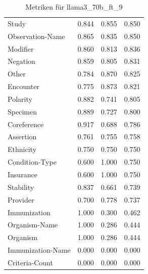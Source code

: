 \begin{table}[htbp]
\begin{tabular}{p{5cm}ccc}
Study & 0.844 & 0.855 & 0.850 \\
Observation-Name & 0.865 & 0.835 & 0.850 \\
Modifier & 0.860 & 0.813 & 0.836 \\
Negation & 0.859 & 0.805 & 0.831 \\
Other & 0.784 & 0.870 & 0.825 \\
Encounter & 0.775 & 0.873 & 0.821 \\
Polarity & 0.882 & 0.741 & 0.805 \\
Specimen & 0.889 & 0.727 & 0.800 \\
Coreference & 0.917 & 0.688 & 0.786 \\
Assertion & 0.761 & 0.755 & 0.758 \\
Ethnicity & 0.750 & 0.750 & 0.750 \\
Condition-Type & 0.600 & 1.000 & 0.750 \\
Insurance & 0.600 & 1.000 & 0.750 \\
Stability & 0.837 & 0.661 & 0.739 \\
Provider & 0.700 & 0.778 & 0.737 \\
Immunization & 1.000 & 0.300 & 0.462 \\
Organism-Name & 1.000 & 0.286 & 0.444 \\
Organism & 1.000 & 0.286 & 0.444 \\
Immunization-Name & 0.000 & 0.000 & 0.000 \\
Criteria-Count & 0.000 & 0.000 & 0.000 \\
\bottomrule
\end{tabular}
\caption{Metriken für llama3_70b_ft_9}
\label{tab:metrics_llama3_70b_ft_9}
\end{table}